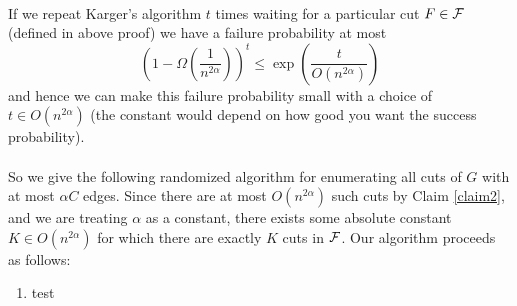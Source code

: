 \documentclass[letterpaper,12pt,oneside,onecolumn]{article}
\begin{document}
\paragraph{}
If we repeat Karger's algorithm $t$ times waiting for a particular cut $F \in \mathcal{F}$ (defined in above proof) we have a failure probability at most
$$(1-\Omega(\frac{1}{n^{2\alpha}}))^t \leq \exp(\frac{t}{O(n^{2{\alpha}})})$$
and hence we can make this failure probability small with a choice of $t \in O(n^{2\alpha})$ (the constant would depend on how good you want the success probability).
\paragraph{}
So we give the following randomized algorithm for enumerating all cuts of $G$ with at most $\alpha C$ edges. Since there are at most $O(n^{2\alpha})$ such cuts by Claim \ref{claim2}, and we are treating $\alpha$ as a constant, there exists some absolute constant $K \in O(n^{2\alpha})$ for which there are exactly $K$ cuts in $\mathcal{F}$. Our algorithm proceeds as follows:
\begin{enumerate}
\item test
\end{enumerate}
\newpage
\section{}

\newpage
\section{}

\newpage
\section{}

\newpage
\section{}

\newpage
\section{}

\newpage
\section{}

\newpage
\section{}

\newpage
\section{}
\end{document}
